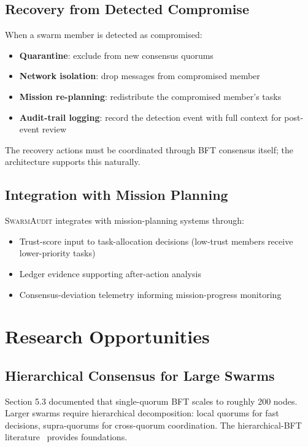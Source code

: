 \documentclass[sigconf,nonacm]{acmart}
\begin{document}
\subsection{Recovery from Detected Compromise}

When a swarm member is detected as compromised:

\begin{itemize}
  \item \textbf{Quarantine}: exclude from new consensus quorums
  \item \textbf{Network isolation}: drop messages from compromised
        member
  \item \textbf{Mission re-planning}: redistribute the
        compromised member's tasks
  \item \textbf{Audit-trail logging}: record the detection event
        with full context for post-event review
\end{itemize}

The recovery actions must be coordinated through BFT consensus
itself; the architecture supports this naturally.

\subsection{Integration with Mission Planning}

\textsc{SwarmAudit} integrates with mission-planning systems
through:

\begin{itemize}
  \item Trust-score input to task-allocation decisions
        (low-trust members receive lower-priority tasks)
  \item Ledger evidence supporting after-action analysis
  \item Consensus-deviation telemetry informing mission-progress
        monitoring
\end{itemize}

\section{Research Opportunities}

\subsection{Hierarchical Consensus for Large Swarms}

Section 5.3 documented that single-quorum BFT scales to roughly
200 nodes. Larger swarms require hierarchical decomposition:
local quorums for fast decisions, supra-quorums for cross-quorum
coordination. The hierarchical-BFT
literature~\cite{abraham2017solidus,gupta2024hierarchicalbft}
provides foundations.
\end{document}
